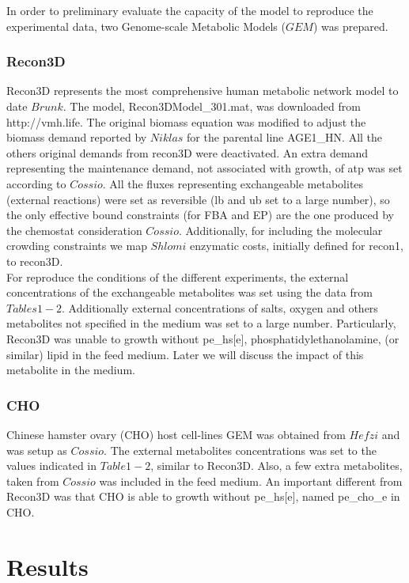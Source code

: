 \documentclass[]{article}
\begin{document}
	In order to preliminary evaluate the capacity of the model to reproduce the experimental data, two Genome-scale Metabolic Models ($GEM$) was prepared.
	
	\subsubsection{Recon3D}

	Recon3D represents the most comprehensive human metabolic network model to date $Brunk$. The model,
	Recon3DModel\_301.mat, was downloaded from http://vmh.life. The original biomass equation was modified to adjust the biomass demand reported by $Niklas$ for the parental line AGE1\_HN. All the others original demands from recon3D were deactivated. An extra demand representing the maintenance demand, not associated with growth, of atp was set according to $Cossio$. All the fluxes representing exchangeable metabolites (external reactions) were set as reversible (lb and ub set to a large number), so the only effective bound constraints (for FBA and EP) are the one produced by the chemostat consideration $Cossio$. Additionally, for including the molecular crowding constraints we map $Shlomi$ enzymatic costs, initially defined for recon1, to recon3D.\\
	For reproduce the conditions of the different experiments, the external concentrations of the exchangeable metabolites was set using the data from $Tables 1-2$. Additionally external concentrations of salts, oxygen and others metabolites not specified in the medium was set to a large number. Particularly, Recon3D was unable to growth without pe\_hs[e], phosphatidylethanolamine, (or similar) lipid in the feed medium. Later we will discuss the impact of this metabolite in the medium.  
	
	\subsubsection{CHO}
	
	Chinese hamster ovary (CHO) host cell-lines GEM was obtained from $Hefzi$ and was setup as $Cossio$.  The external metabolites concentrations was set to the values indicated in $Table 1-2$, similar to Recon3D. Also, a few extra metabolites, taken from $Cossio$ was included in the feed medium. An important different from Recon3D was that CHO is able to growth without pe\_hs[e], named pe\_cho\_e in CHO. 
	


\section{Results} %
\end{document}
